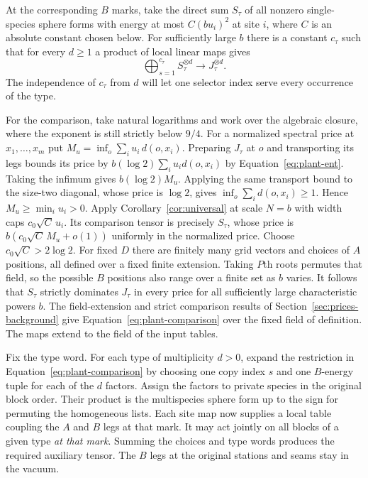 At the corresponding $B$ marks, take the direct sum $S_\tau$ of all
nonzero single-species sphere forms with energy at most $C(bu_i)^2$
at site $i$, where $C$ is an absolute constant chosen below. For
sufficiently large $b$ there is a constant $c_\tau$ such that for
every $d\ge1$ a product of local linear maps gives
\begin{equation}\label{eq:plant-comparison}
 \bigoplus_{s=1}^{c_\tau} S_\tau^{\otimes d}
                    \longrightarrow J_\tau^{\otimes d}.
\end{equation}
The independence of $c_\tau$ from $d$ will let one selector index
serve every occurrence of the type.

For the comparison, take natural logarithms and work over the
algebraic closure, where the exponent is still strictly below $9/4$.
For a normalized spectral price at $x_1,\ldots,x_m$ put
$M_u=\inf_o\sum_i u_i\,d(o,x_i)$. Preparing $J_\tau$ at $o$ and
transporting its legs bounds its price by $b(\log 2)\sum_i u_i d(o,x_i)$
by Equation~\eqref{eq:plant-ent}. Taking the infimum gives $b(\log 2)M_u$. Applying the same transport bound to
the size-two diagonal, whose price is $\log 2$, gives
$\inf_o\sum_i d(o,x_i)\ge1$. Hence $M_u\ge\min_i u_i>0$.
Apply Corollary~\ref{cor:universal} at scale $N=b$ with width caps
$c_0\sqrt C\,u_i$. Its comparison tensor is precisely $S_\tau$,
whose price is $b(c_0\sqrt C\,M_u+o(1))$ uniformly in the normalized
price.
Choose $c_0\sqrt C>2\log 2$. For fixed $D$ there are finitely many
grid vectors and choices of $A$ positions, all defined over a fixed
finite extension. Taking $P$th roots permutes that field, so the
possible $B$ positions also range over a finite set as $b$ varies.
It follows that $S_\tau$ strictly dominates $J_\tau$ in every price
for all sufficiently large characteristic powers $b$.
The field-extension and strict comparison results of
Section~\ref{sec:prices-background} give Equation~\eqref{eq:plant-comparison}
over the fixed field of definition. The maps extend to the field of
the input tables.

Fix the type word. For each type of multiplicity $d>0$, expand the
restriction in Equation~\eqref{eq:plant-comparison} by choosing one
copy index $s$ and one $B$-energy tuple for each of the $d$ factors.
Assign the factors to private species in the original block order.
Their product is the multispecies sphere form up to the sign for
permuting the homogeneous lists. Each site map now supplies a local
table coupling the $A$ and $B$ legs at that mark. It may act jointly
on all blocks of a given type \emph{at that mark}. Summing the choices
and type words produces the required auxiliary tensor. The $B$ legs
at the original stations and seams stay in the vacuum.

